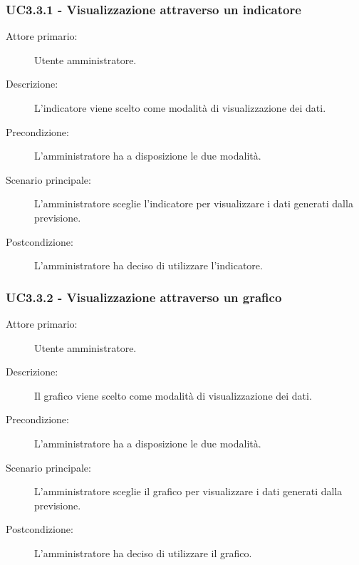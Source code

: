 \subsubsection{UC3.3.1 - Visualizzazione attraverso un indicatore}
\label{sssec:uc3.3.1}
\begin{description}
  \item[Attore primario:] Utente amministratore.
  \item[Descrizione:] L'indicatore viene scelto come modalità di visualizzazione dei dati.
  \item[Precondizione:] L'amministratore ha a disposizione le due modalità.
  \item[Scenario principale:] L'amministratore sceglie l'indicatore per visualizzare i dati generati dalla previsione.
  \item[Postcondizione:] L'amministratore ha deciso di utilizzare l'indicatore.
\end{description}

\subsubsection{UC3.3.2 - Visualizzazione attraverso un grafico}
\label{sssec:uc3.3.2}
\begin{description}
  \item[Attore primario:] Utente amministratore.
  \item[Descrizione:] Il grafico viene scelto come modalità di visualizzazione dei dati.
  \item[Precondizione:] L'amministratore ha a disposizione le due modalità.
  \item[Scenario principale:] L'amministratore sceglie il grafico per visualizzare i dati generati dalla previsione.
  \item[Postcondizione:] L'amministratore ha deciso di utilizzare il grafico.
\end{description}
